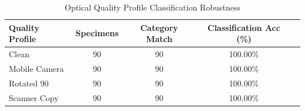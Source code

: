 \begin{table}[htbp]
\caption{Optical Quality Profile Classification Robustness}
\label{tab:degradation_robustness}
\centering
\begin{tabular}{lcccc}
\hline
\textbf{Quality Profile} & \textbf{Specimens} & \textbf{Category Match} & \textbf{Classification Acc (\%)} \\
\hline
Clean & 90 & 90 & 100.00\% \\
Mobile Camera & 90 & 90 & 100.00\% \\
Rotated 90 & 90 & 90 & 100.00\% \\
Scanner Copy & 90 & 90 & 100.00\% \\
\hline
\end{tabular}
\end{table}
